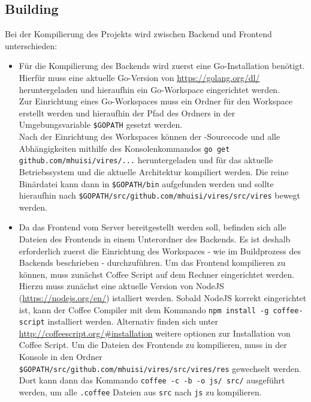 \subsection{Building}
Bei der Kompilierung des Projekts wird zwischen Backend und Frontend unterschieden:
\begin{itemize}
	\item Für die Kompilierung des Backends wird zuerst eine Go-Installation benötigt.\\
	Hierfür muss eine aktuelle Go-Version von \url{https://golang.org/dl/} heruntergeladen und hieraufhin ein Go-Workspace eingerichtet werden.\\
	Zur Einrichtung eines Go-Workspaces muss ein Ordner für den Workspace erstellt werden und hieraufhin der Pfad des Ordners in der Umgebungsvariable 
	\verb+$GOPATH+ gesetzt werden.\\
	Nach der Einrichtung des Workspaces können der \vires-Sourcecode und alle Abhängigkeiten mithilfe des Konsolenkommandos
	\verb+go get github.com/mhuisi/vires/...+ heruntergeladen und für das aktuelle Betriebssystem und die aktuelle Architektur kompiliert werden. 
	Die reine Binärdatei kann dann in \verb+$GOPATH/bin+ aufgefunden werden und sollte hieraufhin nach
	\verb+$GOPATH/src/github.com/mhuisi/vires/src/vires+ bewegt werden.
	\item Da das Frontend vom Server bereitgestellt werden soll, befinden sich alle Dateien des Frontends in einem Unterordner des Backends. Es ist deshalb erforderlich zuerst die Einrichtung des Workspaces - wie im Buildprozess des Backends beschrieben - durchzuführen.
	Um das Frontend kompilieren zu können, muss zunächst Coffee Script auf dem Rechner eingerichtet werden. Hierzu muss zunächst eine aktuelle Version von NodeJS (\url{https://nodejs.org/en/}) istalliert werden. Sobald NodeJS korrekt eingerichtet ist, kann der Coffee Compiler mit dem Kommando \verb+npm install -g coffee-script+ installiert werden. Alternativ finden sich unter \url{http://coffeescript.org/\#installation} weitere optionen zur Installation von Coffee Script.
	Um die Dateien des Frontends zu kompilieren, muss in der Konsole in den Ordner \verb+$GOPATH/src/github.com/mhuisi/vires/src/vires/res+ gewechselt werden. Dort kann dann das Kommando \verb+coffee -c -b -o js/ src/+ ausgeführt werden, um alle \verb+.coffee+ Dateien aus \verb+src+ nach \verb+js+ zu kompilieren.
\end{itemize}